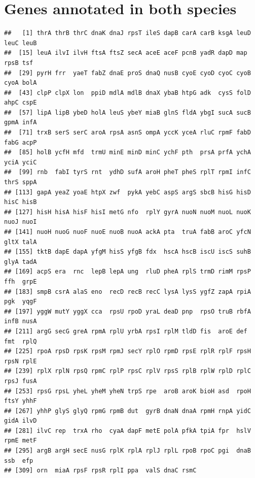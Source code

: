 \documentclass[10pt]{article}\usepackage[]{graphicx}\usepackage[]{color}
\makeatletter
\newenvironment{kframe}{%
 \def\at@end@of@kframe{}%
 \ifinner\ifhmode%
  \def\at@end@of@kframe{\end{minipage}}%
  \begin{minipage}{\columnwidth}%
 \fi\fi%
 \def\FrameCommand##1{\hskip\@totalleftmargin \hskip-\fboxsep
 \colorbox{shadecolor}{##1}\hskip-\fboxsep
     \hskip-\linewidth \hskip-\@totalleftmargin \hskip\columnwidth}%
 \MakeFramed {\advance\hsize-\width
   \@totalleftmargin\z@ \linewidth\hsize
   \@setminipage}}%
 {\par\unskip\endMakeFramed%
 \at@end@of@kframe}
\newenvironment{knitrout}{}{} %
\theoremstyle{plain}
\theoremstyle{definition}
\makeatother
\begin{document}
\section{Genes annotated in both species}
\begin{knitrout}
\color{fgcolor}\begin{kframe}
\begin{verbatim}
##   [1] thrA thrB thrC dnaK dnaJ rpsT ileS dapB carA carB ksgA leuD leuC leuB
##  [15] leuA ilvI ilvH ftsA ftsZ secA aceE aceF pcnB yadR dapD map  rpsB tsf 
##  [29] pyrH frr  yaeT fabZ dnaE proS dnaQ nusB cyoE cyoD cyoC cyoB cyoA bolA
##  [43] clpP clpX lon  ppiD mdlA mdlB dnaX ybaB htpG adk  cysS folD ahpC cspE
##  [57] lipA lipB ybeD holA leuS ybeY miaB glnS fldA ybgI sucA sucB gpmA infA
##  [71] trxB serS serC aroA rpsA asnS ompA yccK yceA rluC rpmF fabD fabG acpP
##  [85] holB ycfH mfd  trmU minE minD minC ychF pth  prsA prfA ychA yciA yciC
##  [99] rnb  fabI tyrS rnt  ydhD sufA aroH pheT pheS rplT rpmI infC thrS sppA
## [113] gapA yeaZ yoaE htpX zwf  pykA yebC aspS argS sbcB hisG hisD hisC hisB
## [127] hisH hisA hisF hisI metG nfo  rplY gyrA nuoN nuoM nuoL nuoK nuoJ nuoI
## [141] nuoH nuoG nuoF nuoE nuoB nuoA ackA pta  truA fabB aroC yfcN gltX talA
## [155] tktB dapE dapA yfgM hisS yfgB fdx  hscA hscB iscU iscS suhB glyA tadA
## [169] acpS era  rnc  lepB lepA ung  rluD pheA rplS trmD rimM rpsP ffh  grpE
## [183] smpB csrA alaS eno  recD recB recC lysA lysS ygfZ zapA rpiA pgk  yqgF
## [197] yggW mutY yggX cca  rpsU rpoD yraL deaD pnp  rpsO truB rbfA infB nusA
## [211] argG secG greA rpmA rplU yrbA rpsI rplM tldD fis  aroE def  fmt  rplQ
## [225] rpoA rpsD rpsK rpsM rpmJ secY rplO rpmD rpsE rplR rplF rpsH rpsN rplE
## [239] rplX rplN rpsQ rpmC rplP rpsC rplV rpsS rplB rplW rplD rplC rpsJ fusA
## [253] rpsG rpsL yheL yheM yheN trpS rpe  aroB aroK bioH asd  rpoH ftsY yhhF
## [267] yhhP glyS glyQ rpmG rpmB dut  gyrB dnaN dnaA rpmH rnpA yidC gidA ilvD
## [281] ilvC rep  trxA rho  cyaA dapF metE polA pfkA tpiA fpr  hslV rpmE metF
## [295] argB argH secE nusG rplK rplA rplJ rplL rpoB rpoC pgi  dnaB ssb  efp 
## [309] orn  miaA rpsF rpsR rplI ppa  valS dnaC rsmC
\end{verbatim}
\end{kframe}
\end{knitrout}
\end{document}
